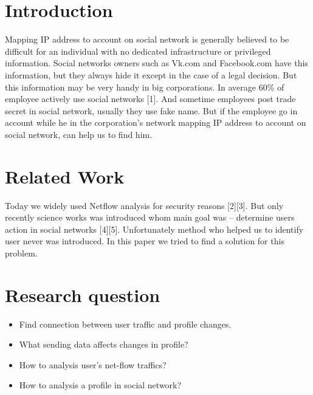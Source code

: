 \documentclass[12pt,a4paper]{report}
\begin{document}
\chapter{Introduction}
Mapping IP address to account on social network is generally believed to be difficult for an individual with no dedicated infrastructure or privileged information. Social networks owners such as Vk.com and Facebook.com have this information, but they always hide it except in the case of a legal decision. But this information may be very handy in big corporations. In average 60\% of employee actively use social networks [1]. And sometime employees post trade secret in social network, usually they use fake name. But if the employee go in  account while he in the corporation's network mapping IP address to account on social network, can help us to find him.

\chapter{Related Work}
Today we widely used Netflow analysis for security reasons [2][3]. But only recently science works was introduced whom main goal was – determine users action in social networks [4][5]. Unfortunately method who helped us to identify user never was introduced. In this paper we tried to find a solution for this problem.

\chapter{Research question}
\begin{itemize}
	\item{Find connection between user traffic and profile changes.}
	\item{What sending data affects changes in profile?}
	\item{How to analysis user's net-flow traffics?}
	\item{How to analysis a profile in social network?}
\end{itemize}
\end{document}
